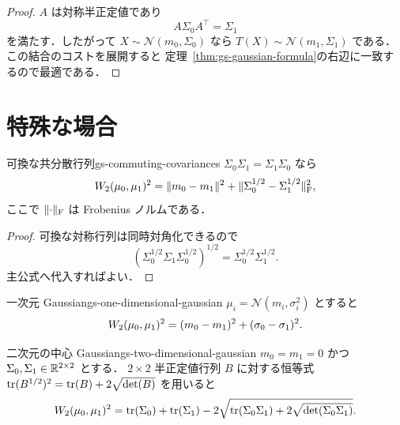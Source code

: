 \begin{proof}
  $A$ は対称半正定値であり
  \[
    A\Sigma_0A^\top=\Sigma_1
  \]
  を満たす．したがって $X\sim\mathcal{N}(m_0,\Sigma_0)$ なら
  $T(X)\sim\mathcal{N}(m_1,\Sigma_1)$ である．
  この結合のコストを展開すると
  定理~\ref{thm:gs-gaussian-formula}の右辺に一致するので最適である．
\end{proof}

\section{特殊な場合}
\label{sec:gaussian-special-cases}

\begin{proposition}{可換な共分散行列}{gs-commuting-covariances}
  $\Sigma_0\Sigma_1=\Sigma_1\Sigma_0$ なら
  \[
    W_2(\mu_0,\mu_1)^2
    =
    \lVert m_0-m_1 \rVert^2
    +
    \lVert \Sigma_0^{1/2}-\Sigma_1^{1/2} \rVert_{\mathrm{F}}^2,
  \]
  ここで $\lVert \cdot \rVert_{\mathrm{F}}$ は Frobenius ノルムである．
\end{proposition}

\begin{proof}
  可換な対称行列は同時対角化できるので
  \[
    \left(
      \Sigma_0^{1/2}\Sigma_1\Sigma_0^{1/2}
    \right)^{1/2}
    =
    \Sigma_0^{1/2}\Sigma_1^{1/2}.
  \]
  主公式へ代入すればよい．
\end{proof}

\begin{example}{一次元 Gaussian}{gs-one-dimensional-gaussian}
  $\mu_i=\mathcal{N}(m_i,\sigma_i^2)$ とすると
  \[
    W_2(\mu_0,\mu_1)^2
    =
    (m_0-m_1)^2+(\sigma_0-\sigma_1)^2.
  \]
\end{example}

\begin{example}{二次元の中心 Gaussian}{gs-two-dimensional-gaussian}
  $m_0=m_1=0$ かつ $\Sigma_0,\Sigma_1\in\mathbb{R}^{2\times2}$ とする．
  $2\times2$ 半正定値行列 $B$ に対する恒等式
  $\operatorname{tr}(B^{1/2})^2=\operatorname{tr}(B)+2\sqrt{\det(B)}$ を用いると
  \[
    W_2(\mu_0,\mu_1)^2
    =
    \operatorname{tr}(\Sigma_0)+\operatorname{tr}(\Sigma_1)
    -2\sqrt{
      \operatorname{tr}(\Sigma_0\Sigma_1)
      +2\sqrt{\det(\Sigma_0\Sigma_1)}
    }.
  \]
\end{example}
